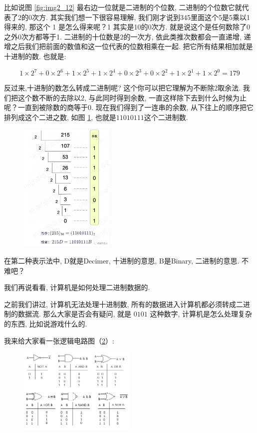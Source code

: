 比如说图 \ref{fig:img2_12} 最右边一位就是二进制的个位数, 二进制的个位数它就代表了2的0次方. 其实我们想一下很容易理解, 我们刚才说到345里面这个5是5乘以1得来的, 那这个 1 是怎么得来呢？1 其实是10的0次方. 就是说这个是任何数除了0之外0次方都等于1. 二进制的十位数是2的一次方, 依此类推次数都会一直递增, 递增之后我们把前面的数值和这一位代表的位数相乘在一起. 把它所有结果相加就是十进制的数. 也就是:

\[
  1\times2^7+0\times2^6+1\times2^5+1\times2^4+0\times2^3+0\times2^2+1\times2^1+1\times2^0=179
\]

反过来,十进制的数怎么转成二进制呢? 这个你可以把它理解为不断除2取余法. 我们把这个数不断的去除以2, 与此同时得到余数, 一直这样除下去到什么时候为止呢？一直到被除数的商等于0. 现在我们得到了一连串的余数, 从下往上的顺序把它排列成这个二进之数, 如图 \ref{fig:img2_13}, 也就是$11010111$这个二进制数. 

\begin{figure}[ht]
  \centering\includegraphics[width=0.4\textwidth]{asset/20231227140715.png}
  \caption{}
  \label{fig:img2_13}
\end{figure}

在第二种表示法中, D就是Decimer, 十进制的意思, B是Binary, 二进制的意思. 不难吧？

我们再说看看, 计算机是如何处理二进制数据的. 

之前我们讲过, 计算机无法处理十进制数, 所有的数据进入计算机都必须转成二进制的数据流. 那么大家是否会有疑问, 就是 $0101$ 这种数字, 计算机是怎么处理复杂的东西, 比如说游戏什么的. 

我来给大家看一张逻辑电路图（\ref{fig:img2_14}）:

\begin{figure}[ht]
  \centering\includegraphics[width=0.5\textwidth]{asset/975a7883-49a7-4b15-8102-0352aebc5568.png}
  \caption{}
  \label{fig:img2_14}
\end{figure}

